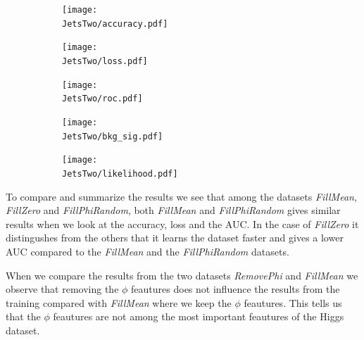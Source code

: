 \documentclass[../../main/main.tex]{subfiles}
\begin{document}
\begin{figure}[H]
  \centering
  \begin{subfigure}[t]{0.5\textwidth}
    \centering
    \texttt{[image: \\JetsTwo/accuracy.pdf]}
    \caption{\captionAcc}
    \label{fig:JetsTwo_acc}
  \end{subfigure}
  \vspace{0.01cm}
  \begin{subfigure}[t]{0.5\textwidth}
    \centering
    \texttt{[image: \\JetsTwo/loss.pdf]}
    \caption{\captionLoss}
    \label{fig:JetsTwo_loss}
  \end{subfigure}
  \begin{subfigure}[t]{0.5\textwidth}
    \centering
    \texttt{[image: \\JetsTwo/roc.pdf]}
    \caption{\captionROC}
    \label{fig:JetsTwo_roc}
  \end{subfigure}
  \caption{}
  \label{fig:JetsTwo_1}  
\end{figure}

\begin{figure}[H]
  \centering
  \begin{subfigure}[t]{0.5\textwidth}
    \centering
    \texttt{[image: \\JetsTwo/bkg\_sig.pdf]}
    \caption{\captionBkgSig}    
    \label{fig:JetsTwo_bkg_sig}
  \end{subfigure}
  \vspace{0.01cm}
  \begin{subfigure}[t]{0.5\textwidth}
    \centering
    \texttt{[image: \\JetsTwo/likelihood.pdf]}
    \caption{\captionLik}    
    \label{fig:JetsTwo_likelihood}
  \end{subfigure}
  \caption{}
  \label{fig:JetsTwo_Z}
\end{figure}

To compare and summarize the results we see that among the datasets \emph{FillMean}, \emph{FillZero} and \emph{FillPhiRandom}, both \emph{FillMean} and \emph{FillPhiRandom} gives similar results when we look at the accuracy, loss and the AUC. In the case of \emph{FillZero} it distingushes from the others that it learns the dataset faster and gives a lower AUC compared to the \emph{FillMean} and the \emph{FillPhiRandom} datasets.

When we compare the results from the two datasets \emph{RemovePhi} and \emph{FillMean} we observe that removing the \(\phi\) feautures does not influence the results from the training compared with \emph{FillMean} where we keep the \(\phi\) feautures. This tells us that the \(\phi\) feautures are not among the most important feautures of the Higgs dataset.
\end{document}
